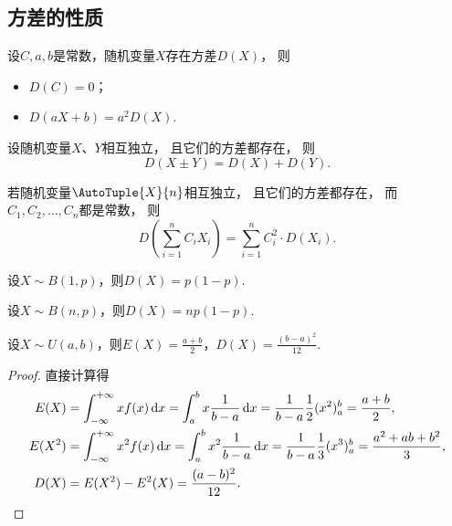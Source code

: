 \subsection{方差的性质}
\begin{property}\label{theorem:随机变量的数字特征.方差的性质1}
设\(C,a,b\)是常数，随机变量\(X\)存在方差\(D(X)\)，
则\begin{itemize}
	\item \(D(C) = 0\)；
	\item \(D(aX+b) = a^2 D(X)\).
\end{itemize}
\end{property}

\begin{property}\label{theorem:随机变量的数字特征.方差的性质2}
设随机变量\(X\)、\(Y\)相互独立，
且它们的方差都存在，
则\[
	D(X \pm Y) = D(X) + D(Y).
\]
\end{property}

\begin{corollary}\label{theorem:随机变量的数字特征.方差的性质3}
若随机变量\(\AutoTuple{X}{n}\)相互独立，
且它们的方差都存在，
而\(C_1,C_2,\dotsc,C_n\)都是常数，
则\[
	D\left( \sum_{i=1}^n C_i X_i \right)
	= \sum_{i=1}^n C_i^2 \cdot D(X_i).
\]
\end{corollary}

\begin{theorem}
设\(X \sim B(1,p)\)，则\(D(X) = p(1-p)\).
\end{theorem}

\begin{theorem}%
设\(X \sim B(n,p)\)，则\(D(X) = np(1-p)\).
\end{theorem}

\begin{theorem}%
设\(X \sim U(a,b)\)，则\(E(X) = \frac{a+b}{2}\)，\(D(X) = \frac{(b-a)^2}{12}\).
\begin{proof}
直接计算得
\begin{align*}
E(X) &= \int_{-\infty}^{+\infty} x f(x) \dd{x}
= \int_a^b x \frac{1}{b-a} \dd{x}
= \frac{1}{b-a} \frac{1}{2} (x^2)_a^b
= \frac{a+b}{2}, \\
E(X^2) &= \int_{-\infty}^{+\infty} x^2 f(x) \dd{x}
= \int_a^b x^2 \frac{1}{b-a} \dd{x}
= \frac{1}{b-a} \frac{1}{3} (x^3)_a^b
= \frac{a^2+ab+b^2}{3}, \\
D(X) &= E(X^2) - E^2(X)
= \frac{(a-b)^2}{12}.
\qedhere
\end{align*}
\end{proof}
\end{theorem}

